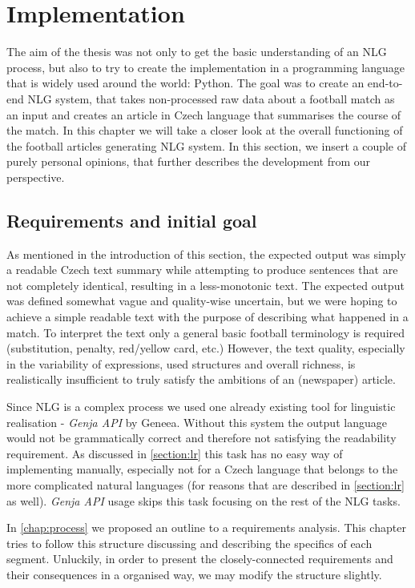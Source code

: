 \chapter{Implementation}\label{chap:implementation}

The aim of the thesis was not only to get the basic understanding of an NLG process, but also to try to create the implementation in a programming language that is widely used around the world: Python. The goal was to create an end-to-end NLG system, that takes non-processed raw data about a football match as an input and creates an article in Czech language that summarises the course of the match. In this chapter we will take a closer look at the overall functioning of the football articles generating NLG system. In this section, we insert a couple of purely personal opinions, that further describes the development from our perspective. 

\section{Requirements and initial goal}
As mentioned in the introduction of this section, the expected output was simply a readable Czech text summary while attempting to produce sentences that are not completely identical, resulting in a less-monotonic text. The expected output was defined somewhat vague and quality-wise uncertain, but we were hoping to achieve a simple readable text with the purpose of describing what happened in a match. To interpret the text only a general basic football terminology is required (substitution, penalty, red/yellow card, etc.) However, the text quality, especially in the variability of expressions, used structures and overall richness, is realistically insufficient to truly satisfy the ambitions of an (newspaper) article. 

Since NLG is a complex process we used one already existing tool for linguistic realisation - \emph{Genja API} by Geneea. Without this system the output language would not be grammatically correct and therefore not satisfying the readability requirement. As discussed in \ref{section:lr} this task has no easy way of implementing manually, especially not for a Czech language that belongs to the more complicated natural languages (for reasons that are described in \ref{section:lr} as well). \emph{Genja API} usage skips this task focusing on the rest of the NLG tasks.

In \autoref{chap:process} we proposed an outline to a requirements analysis. This chapter tries to follow this structure discussing and describing the specifics of each segment. Unluckily, in order to present the closely-connected requirements and their consequences in a organised way, we may modify the structure slightly.

